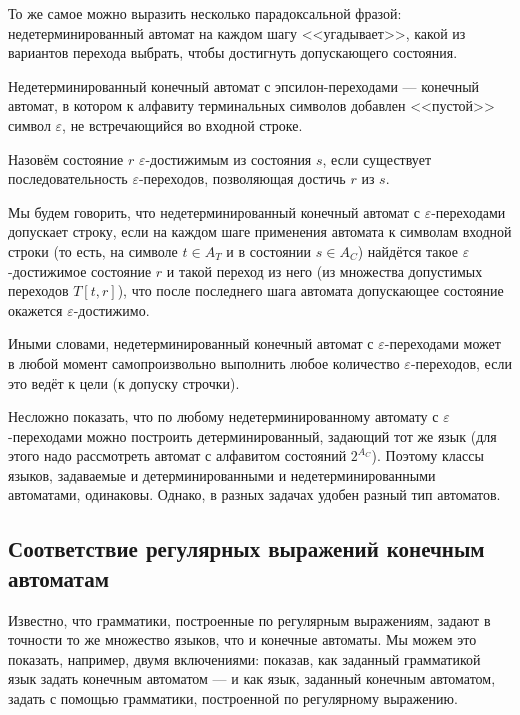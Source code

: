 \documentclass[12pt,a4paper,oneside]{article}
\begin{document}
То же самое можно выразить несколько парадоксальной фразой: недетерминированный автомат 
на каждом шагу <<угадывает>>, какой из вариантов перехода выбрать, чтобы достигнуть 
допускающего состояния. 

\begin{definition}
Недетерминированный конечный автомат с эпсилон-переходами --- 
конечный автомат, в котором к алфавиту терминальных символов добавлен <<пустой>> символ
$\varepsilon$, не встречающийся во входной строке.
\end{definition}

\begin{definition}
Назовём состояние $r$ $\varepsilon$-достижимым из состояния $s$, если существует последовательность
$\varepsilon$-переходов, позволяющая достичь $r$ из $s$.
\end{definition}

\begin{definition}
Мы будем говорить, что недетерминированный конечный автомат с $\varepsilon$-переходами 
допускает строку, если на каждом шаге применения автомата к символам входной строки 
(то есть, на символе $t \in A_T$ и в состоянии $s \in A_C$) найдётся такое 
$\varepsilon$-достижимое состояние $r$ и такой переход из него (из множества допустимых 
переходов $T[t,r]$), что после последнего шага автомата допускающее состояние окажется
$\varepsilon$-достижимо.
\end{definition}

Иными словами, недетерминированный конечный автомат с $\varepsilon$-переходами может в
любой момент самопроизвольно выполнить любое количество $\varepsilon$-переходов,
если это ведёт к цели (к допуску строчки).

Несложно показать, что по любому недетерминированному автомату с $\varepsilon$-переходами 
можно построить детерминированный, задающий тот же язык (для этого надо рассмотреть автомат 
с алфавитом состояний $2^{A_C}$). Поэтому классы языков, задаваемые и детерминированными и
недетерминированными автоматами, одинаковы. Однако, в разных задачах удобен разный тип
автоматов. 

\subsection{Соответствие регулярных выражений конечным автоматам}

Известно, что грамматики, построенные по регулярным выражениям, задают в точности то же 
множество языков, что и конечные автоматы.
Мы можем это показать, например, двумя включениями: показав, как заданный грамматикой язык
задать конечным автоматом --- и как язык, заданный конечным автоматом, задать с помощью 
грамматики, построенной по регулярному выражению.
\end{document}
